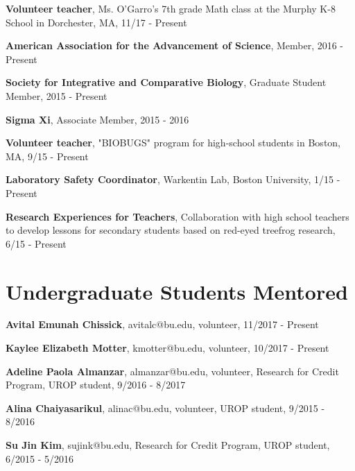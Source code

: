\documentclass[margin,line]{res}
\begin{document}
\begin{resume}
{\bf Volunteer teacher},  Ms. O'Garro's 7th grade Math class at the Murphy K-8 School in Dorchester, MA, 11/17 - Present

{\bf American Association for the Advancement of Science}, Member, 2016 - Present 

{\bf Society for Integrative and Comparative Biology}, Graduate Student Member, 2015 - Present 

{\bf Sigma Xi},  Associate Member, 2015 - 2016 

{\bf Volunteer teacher},  "BIOBUGS" program for high-school students in Boston, MA, 9/15 - Present 

{\bf Laboratory Safety Coordinator},  Warkentin Lab, Boston University, 1/15 - Present 

{\bf Research Experiences for Teachers},  Collaboration with high school teachers to develop lessons for secondary students based on red-eyed treefrog research, 6/15 - Present

\section{\sc Undergraduate Students Mentored}

{\bf Avital Emunah Chissick}, avitalc@bu.edu, volunteer, 11/2017 - Present
\vspace*{-0.5mm}

{\bf Kaylee Elizabeth Motter}, kmotter@bu.edu, volunteer, 10/2017 - Present
\vspace*{-0.5mm}

{\bf Adeline Paola Almanzar}, almanzar@bu.edu, volunteer, Research for Credit Program, UROP student, 9/2016 - 8/2017
\vspace*{-0.5mm}

{\bf Alina Chaiyasarikul}, alinac@bu.edu, volunteer, UROP student, 9/2015 - 8/2016
\vspace*{-0.5mm}

{\bf Su Jin Kim}, sujink@bu.edu, Research for Credit Program, UROP student, 6/2015 - 5/2016
\end{resume}
\end{document}
